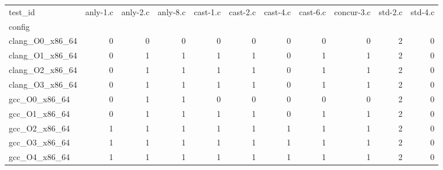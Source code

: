 \begin{tabular}{lrrrrrrrrrr}
\toprule
test_id & anly-1.c & anly-2.c & anly-8.c & cast-1.c & cast-2.c & cast-4.c & cast-6.c & concur-3.c & std-2.c & std-4.c \\
config &  &  &  &  &  &  &  &  &  &  \\
\midrule
clang_O0_x86_64 & 0 & 0 & 0 & 0 & 0 & 0 & 0 & 0 & 2 & 0 \\
clang_O1_x86_64 & 0 & 1 & 1 & 1 & 1 & 0 & 1 & 1 & 2 & 0 \\
clang_O2_x86_64 & 0 & 1 & 1 & 1 & 1 & 0 & 1 & 1 & 2 & 0 \\
clang_O3_x86_64 & 0 & 1 & 1 & 1 & 1 & 0 & 1 & 1 & 2 & 0 \\
gcc_O0_x86_64 & 0 & 1 & 1 & 0 & 0 & 0 & 0 & 0 & 2 & 0 \\
gcc_O1_x86_64 & 0 & 1 & 1 & 1 & 1 & 0 & 1 & 1 & 2 & 0 \\
gcc_O2_x86_64 & 1 & 1 & 1 & 1 & 1 & 1 & 1 & 1 & 2 & 0 \\
gcc_O3_x86_64 & 1 & 1 & 1 & 1 & 1 & 1 & 1 & 1 & 2 & 0 \\
gcc_O4_x86_64 & 1 & 1 & 1 & 1 & 1 & 1 & 1 & 1 & 2 & 0 \\
\bottomrule
\end{tabular}
